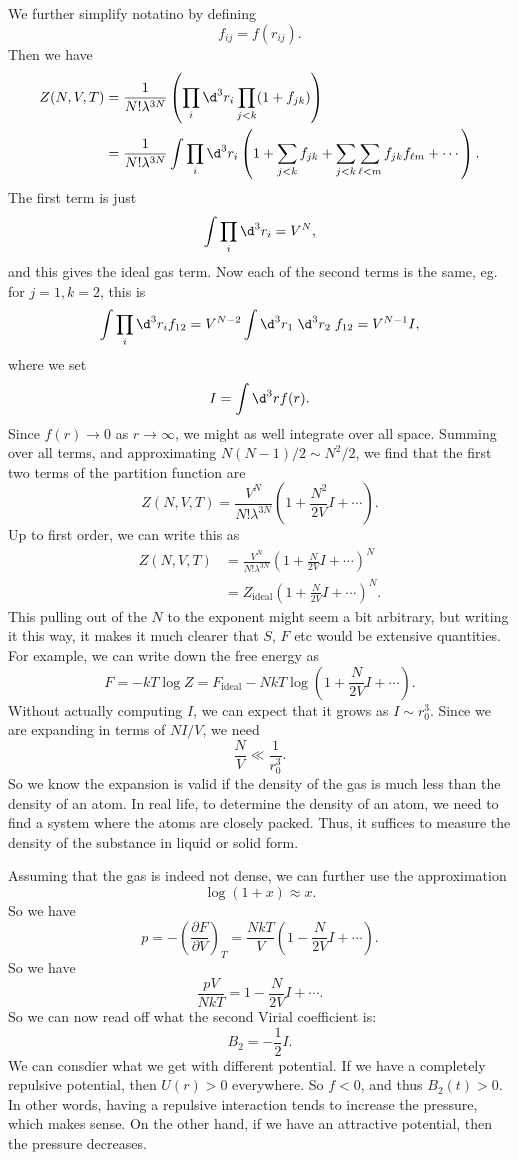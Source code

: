 \documentclass[a4paper]{article}
\begin{document}
We further simplify notatino by defining
\[
  f_{ij} = f(r_{ij}).
\]
Then we have
\begin{align*}
  Z(N, V, T) &= \frac{1}{N! \lambda^{3N}} \left(\prod_i \d^3 r_i\prod_{j < k} (1 + f_{jk})\right)\\
  &= \frac{1}{N!\lambda^{3N}} \int \prod_i \d^3 r_i \left(1 + \sum_{j < k} f_{jk} + \sum_{j < k} \sum_{\ell < m} f_{jk} f_{\ell m} + \cdots\right).
\end{align*}
The first term is just
\[
  \int \prod_i \d^3 r_i = V^N,
\]
and this gives the ideal gas term. Now each of the second terms is the same, eg. for $j = 1, k = 2$, this is
\[
  \int \prod_i \d^3 r_i f_{12} = V^{N - 2} \int \d^3 r_1 \; \d^3 r_2\; f_{12} = V^{N - 1} I,
\]
where we set
\[
  I = \int\d^3 r f(r).
\]
Since $f(r) \to 0$ as $r \to \infty$, we might as well integrate over all space. Summing over all terms, and approximating $N(N - 1)/2 \sim N^2/2$, we find that the first two terms of the partition function are
\[
  Z(N, V, T) = \frac{V^N}{N! \lambda^{3N}} \left(1 + \frac{N^2}{2V}I + \cdots\right).
\]
Up to first order, we can write this as
\begin{align*}
  Z(N, V, T) &= \frac{V^N}{N! \lambda^{3N}} \left(1 + \frac{N}{2V}I + \cdots\right)^N\\
  &= Z_{\mathrm{ideal}} \left(1 + \frac{N}{2V}I + \cdots \right)^N.
\end{align*}
This pulling out of the $N$ to the exponent might seem a bit arbitrary, but writing it this way, it makes it much clearer that $S$, $F$ etc would be extensive quantities. For example, we can write down the free energy as
\[
  F = -kT \log Z = F_{\mathrm{ideal}} - NkT \log \left(1 + \frac{N}{2V} I + \cdots\right).
\]
Without actually computing $I$, we can expect that it grows as $I \sim r_0^3$. Since we are expanding in terms of $NI/V$, we need
\[
  \frac{N}{V} \ll \frac{1}{r_0^3}.
\]
So we know the expansion is valid if the density of the gas is much less than the density of an atom. In real life, to determine the density of an atom, we need to find a system where the atoms are closely packed. Thus, it suffices to measure the density of the substance in liquid or solid form.

Assuming that the gas is indeed not dense, we can further use the approximation
\[
  \log(1 + x) \approx x.
\]
So we have
\[
  p = - \left(\frac{\partial F}{\partial V}\right)_T = \frac{NkT}{V}\left(1 - \frac{N}{2V} I + \cdots\right).
\]
So we have
\[
  \frac{pV}{NkT} = 1 - \frac{N}{2V} I + \cdots.
\]
So we can now read off what the second Virial coefficient is:
\[
  B_2 = -\frac{1}{2} I.
\]
We can consdier what we get with different potential. If we have a completely repulsive potential, then $U(r) > 0$ everywhere. So $f < 0$, and thus $B_2(t) > 0$. In other words, having a repulsive interaction tends to increase the pressure, which makes sense. On the other hand, if we have an attractive potential, then the pressure decreases.
\end{document}

